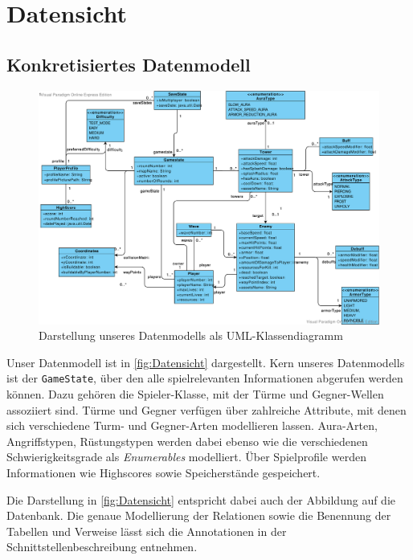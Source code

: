 \documentclass[enabledeprecatedfontcommands,fontsize=12pt,paper=a4,twoside,parskip=half]{scrartcl}
\begin{document}
\clearpage

\section{Datensicht}
\label{sec:datensicht}



\subsection{Konkretisiertes Datenmodell}
\label{subsec:datenmodell}


\begin{figure}[H]
    \centering
    \includegraphics[width=\textwidth]{Bilder/Datenmodell.pdf}
    \caption{Darstellung unseres Datenmodells als UML-Klassendiagramm}
    \label{fig:Datensicht}
\end{figure}

Unser Datenmodell ist in \autoref{fig:Datensicht} dargestellt. Kern unseres Datenmodells ist der \texttt{GameState}, über den alle spielrelevanten Informationen abgerufen werden können. Dazu gehören die Spieler-Klasse, mit der Türme und Gegner-Wellen assoziiert sind. Türme und Gegner verfügen über zahlreiche Attribute, mit denen sich verschiedene Turm- und Gegner-Arten modellieren lassen. Aura-Arten, Angriffstypen, Rüstungstypen werden dabei ebenso wie die verschiedenen Schwierigkeitsgrade als \textit{Enumerables} modelliert. Über Spielprofile werden Informationen wie Highscores sowie Speicherstände gespeichert.

Die Darstellung in \autoref{fig:Datensicht} entspricht dabei auch der Abbildung auf die Datenbank. Die genaue Modellierung der Relationen sowie die Benennung der Tabellen und Verweise lässt sich die Annotationen in der Schnittstellenbeschreibung entnehmen.
\end{document}
